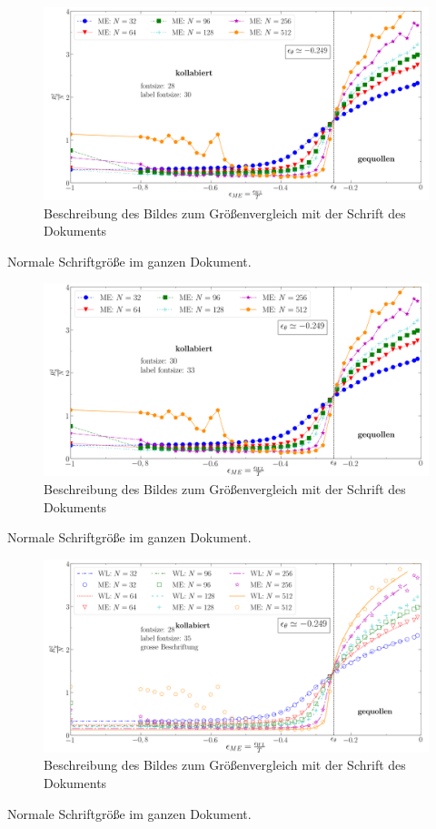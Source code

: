 \begin{figure}[H]

\includegraphics[width=\textwidth]{png_28_30.png}
\caption{Beschreibung des Bildes zum Größenvergleich mit der Schrift des Dokuments}
\end{figure}
Normale Schriftgröße im ganzen Dokument.
\begin{figure}[H]
\includegraphics[width=\textwidth]{png_30_30.png}
\caption{Beschreibung des Bildes zum Größenvergleich mit der Schrift des Dokuments}
\end{figure}
Normale Schriftgröße im ganzen Dokument.
\begin{figure}[H]
\includegraphics[width=\textwidth]{pngwl_28_28}
\caption{Beschreibung des Bildes zum Größenvergleich mit der Schrift des Dokuments}
\end{figure}
Normale Schriftgröße im ganzen Dokument.




